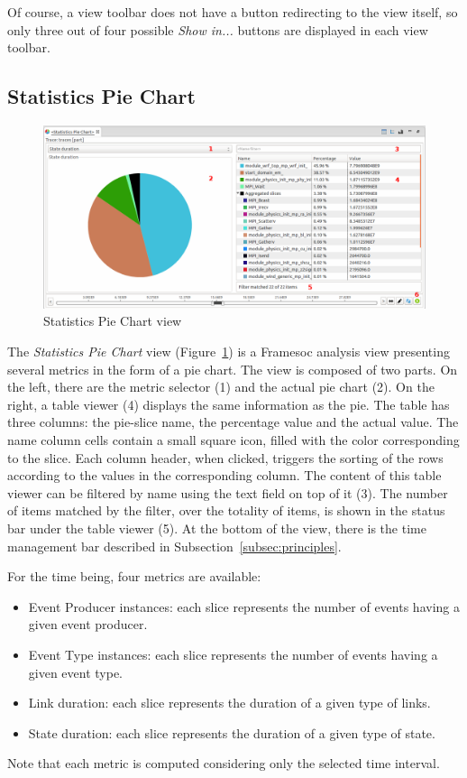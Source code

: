 \documentclass[twoside]{article}
\begin{document}
\begin{sloppypar}
Of course, a view toolbar does not have a button redirecting to the view itself, so only three out of four possible \emph{Show in...} buttons are displayed in each view toolbar.

\subsection{Statistics Pie Chart}
\label{subsec:pie}

\begin{figure}[h!]
  \centering
    \includegraphics[width=1.0\textwidth]{images/pie.png}
  \caption{Statistics Pie Chart view}
  \label{fig:pie_chart}
\end{figure}

The \emph{Statistics Pie Chart} view (Figure~\ref{fig:pie_chart}) is a Framesoc analysis view presenting several metrics in the form of a pie chart.
The view is composed of two parts.
On the left, there are the metric selector (\num{1}) and the actual pie chart (\num{2}).
On the right, a table viewer (\num{4}) displays the same information as the pie. 
The table has three columns: the pie-slice name, the percentage value and the actual value. 
The name column cells contain a small square icon, filled with the color corresponding to the slice.
Each column header, when clicked, triggers the sorting of the rows according to the values in the corresponding column.
The content of this table viewer can be filtered by name using the text field on top of it (\num{3}). 
The number of items matched by the filter, over the totality of items, is shown in the status bar under the table viewer (\num{5}).
At the bottom of the view, there is the time management bar described in Subsection~\ref{subsec:principles}.

For the time being, four metrics are available: 
\begin{itemize}
 \item Event Producer instances: each slice represents the number of events having a given event producer.
 \item Event Type instances: each slice represents the number of events having a given event type.
 \item Link duration: each slice represents the duration of a given type of links.
 \item State duration: each slice represents the duration of a given type of state.
\end{itemize}
Note that each metric is computed considering only the selected time interval.


\end{sloppypar}
\end{document}
